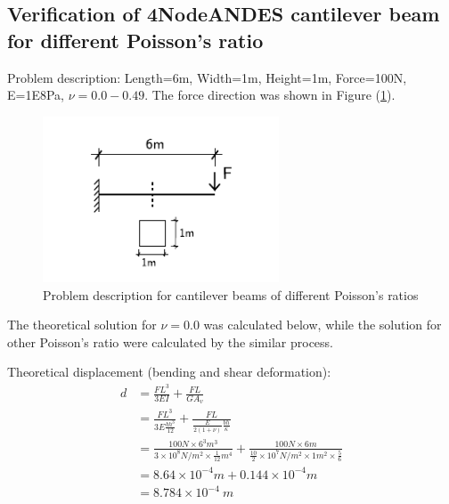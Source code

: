 \documentclass[fleqn,11pt]{article}
\begin{document}








\newpage
\subsection{Verification of 4NodeANDES cantilever beam for different Poisson's ratio}




Problem description: Length=6m, Width=1m, Height=1m, Force=100N, E=1E8Pa, $\nu=0.0-0.49$. The force direction was shown in Figure (\ref{fig Problem description for cantilever beams of different Poisson's 4}). 

\begin{figure}[H]
  \centering
  \includegraphics[width=7cm]{../Figure-files/cantilever_6.pdf}
  \caption{Problem description for cantilever beams of different Poisson's ratios}
  \label{fig Problem description for cantilever beams of different Poisson's 4}
\end{figure}


The theoretical solution for $\nu=0.0$ was calculated below, while the solution for other Poisson's ratio were calculated by the similar process.

Theoretical displacement (bending and shear deformation):
\begin{equation}
  \begin{aligned}
  d &=\frac{FL^3}{3EI}+\frac{FL}{GA_v} \\
  &= \frac{FL^3}{3E\frac{bh^3}{12}}+\frac{FL}{\frac{E}{2(1+\nu)} \frac{bh}{\kappa}} \\ 
    &= \frac{100 N \times 6^3 m^3}{3\times 10^8 N/m^2 \times \frac{1}{12} m^4}+ 
    \frac{100 N\times 6 m}{\frac{10}{2} \times 10^7 N/m^2\times 1 m^2 \times \frac{5}{6}} \\ 
    &=8.64\times 10^{-4} m + 0.144 \times 10^{-4} m   \\
   & =8.784\times 10^{-4} \ m
   \end{aligned}
\end{equation}
\end{document}
